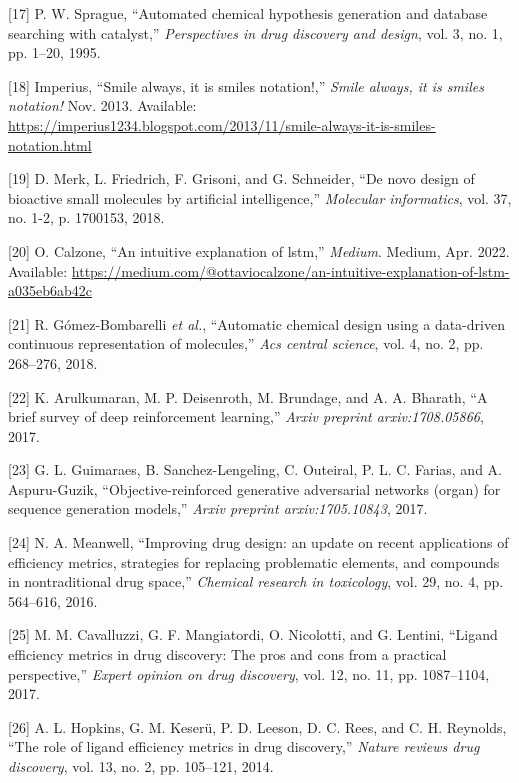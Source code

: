 \documentclass[11pt]{article}
\begin{document}
\hypertarget{citeproc_bib_item_17}{[17] P. W. Sprague, “Automated chemical hypothesis generation and database searching with catalyst,” \textit{Perspectives in drug discovery and design}, vol. 3, no. 1, pp. 1–20, 1995.}

\hypertarget{citeproc_bib_item_18}{[18] Imperius, “Smile always, it is smiles notation!,” \textit{Smile always, it is smiles notation!} Nov. 2013. Available: \url{https://imperius1234.blogspot.com/2013/11/smile-always-it-is-smiles-notation.html}}

\hypertarget{citeproc_bib_item_19}{[19] D. Merk, L. Friedrich, F. Grisoni, and G. Schneider, “De novo design of bioactive small molecules by artificial intelligence,” \textit{Molecular informatics}, vol. 37, no. 1-2, p. 1700153, 2018.}

\hypertarget{citeproc_bib_item_20}{[20] O. Calzone, “An intuitive explanation of lstm,” \textit{Medium}. Medium, Apr. 2022. Available: \url{https://medium.com/@ottaviocalzone/an-intuitive-explanation-of-lstm-a035eb6ab42c}}

\hypertarget{citeproc_bib_item_21}{[21] R. Gómez-Bombarelli \textit{et al.}, “Automatic chemical design using a data-driven continuous representation of molecules,” \textit{Acs central science}, vol. 4, no. 2, pp. 268–276, 2018.}

\hypertarget{citeproc_bib_item_22}{[22] K. Arulkumaran, M. P. Deisenroth, M. Brundage, and A. A. Bharath, “A brief survey of deep reinforcement learning,” \textit{Arxiv preprint arxiv:1708.05866}, 2017.}

\hypertarget{citeproc_bib_item_23}{[23] G. L. Guimaraes, B. Sanchez-Lengeling, C. Outeiral, P. L. C. Farias, and A. Aspuru-Guzik, “Objective-reinforced generative adversarial networks (organ) for sequence generation models,” \textit{Arxiv preprint arxiv:1705.10843}, 2017.}

\hypertarget{citeproc_bib_item_24}{[24] N. A. Meanwell, “Improving drug design: an update on recent applications of efficiency metrics, strategies for replacing problematic elements, and compounds in nontraditional drug space,” \textit{Chemical research in toxicology}, vol. 29, no. 4, pp. 564–616, 2016.}

\hypertarget{citeproc_bib_item_25}{[25] M. M. Cavalluzzi, G. F. Mangiatordi, O. Nicolotti, and G. Lentini, “Ligand efficiency metrics in drug discovery: The pros and cons from a practical perspective,” \textit{Expert opinion on drug discovery}, vol. 12, no. 11, pp. 1087–1104, 2017.}

\hypertarget{citeproc_bib_item_26}{[26] A. L. Hopkins, G. M. Keserü, P. D. Leeson, D. C. Rees, and C. H. Reynolds, “The role of ligand efficiency metrics in drug discovery,” \textit{Nature reviews drug discovery}, vol. 13, no. 2, pp. 105–121, 2014.}
\end{document}
